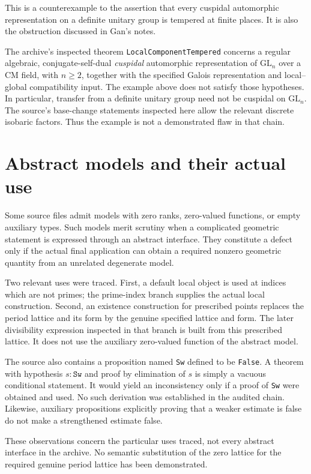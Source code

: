\documentclass[11pt,a4paper]{article}
\theoremstyle{remark}
\newcommand{\src}[1]{\cite{#1}}
\newcommand{\code}[1]{\texttt{#1}}
\begin{document}
This is a counterexample to the assertion that every cuspidal automorphic representation on a definite unitary group is tempered at finite places. It is also the obstruction discussed in Gan's notes. \src{gan}

The archive's inspected theorem \code{LocalComponentTempered} concerns a regular algebraic, conjugate-self-dual \emph{cuspidal} automorphic representation of $\mathrm{GL}_n$ over a CM field, with $n\ge2$, together with the specified Galois representation and local--global compatibility input. The example above does not satisfy those hypotheses. In particular, transfer from a definite unitary group need not be cuspidal on $\mathrm{GL}_n$. The source's base-change statements inspected here allow the relevant discrete isobaric factors. Thus the example is not a demonstrated flaw in that chain. \src{S-tempered}

\section{Abstract models and their actual use}
Some source files admit models with zero ranks, zero-valued functions, or empty auxiliary types. Such models merit scrutiny when a complicated geometric statement is expressed through an abstract interface. They constitute a defect only if the actual final application can obtain a required nonzero geometric quantity from an unrelated degenerate model.

Two relevant uses were traced. First, a default local object is used at indices which are not primes; the prime-index branch supplies the actual local construction. Second, an existence construction for prescribed points replaces the period lattice and its form by the genuine specified lattice and form. The later divisibility expression inspected in that branch is built from this prescribed lattice. It does not use the auxiliary zero-valued function of the abstract model. \src{S-models}

The source also contains a proposition named \code{Sw} defined to be \code{False}. A theorem with hypothesis $s:\code{Sw}$ and proof by elimination of $s$ is simply a vacuous conditional statement. It would yield an inconsistency only if a proof of \code{Sw} were obtained and used. No such derivation was established in the audited chain. Likewise, auxiliary propositions explicitly proving that a weaker estimate is false do not make a strengthened estimate false.

These observations concern the particular uses traced, not every abstract interface in the archive. No semantic substitution of the zero lattice for the required genuine period lattice has been demonstrated.
\end{document}
